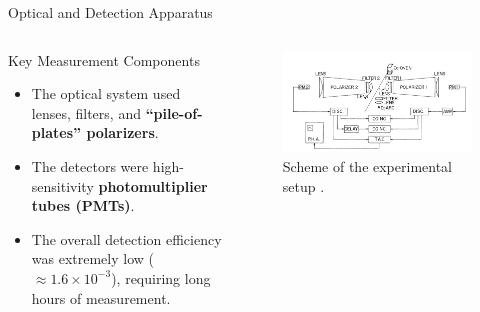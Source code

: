 \begin{frame}{Optical and Detection Apparatus}
  
  \begin{columns}[T]
    \begin{column}{0.6\textwidth}
      \begin{block}{Key Measurement Components}
        \begin{itemize}[<+->]
          \item The optical system used lenses, filters, and \textbf{``pile-of-plates'' polarizers}.
          \item The detectors were high-sensitivity \textbf{photomultiplier tubes (PMTs)}.
          \item The overall detection efficiency was extremely low ($\approx 1.6 \times 10^{-3} $), requiring long hours of measurement.
        \end{itemize}
      \end{block}
    \end{column}
    
    \begin{column}{0.4\textwidth}
      \begin{figure}
        \centering
        \includegraphics[width=\linewidth, height=0.7\textheight, keepaspectratio]{images/clauster.png}
        \caption{Scheme of the experimental setup \cite{Freedman1972}.}
      \end{figure}
    \end{column}
  \end{columns}

\end{frame}

